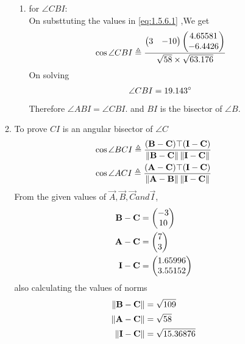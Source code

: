 \documentclass[11pt]{book}
\begin{document}
\begin{enumerate}[label=\thesection.\arabic*.,ref=\thesection.\theenumi]
\begin{enumerate}
\begin{enumerate}
       \item for $\angle CBI$: \\
    On substtuting the values in  \eqref{eq:1.5.6.1} ,We get 
    \begin{align}
        \cos{\angle CBI} \triangleq \frac{\begin{pmatrix} 3 & -10\end{pmatrix}\begin{pmatrix}4.65581 \\ -6.4426\end{pmatrix}}{ \sqrt{58} \times \sqrt{63.176}} \\
    \end{align}
    On solving 
    \begin{align}
        \angle CBI = 19.143\degree
    \end{align}
    Therefore $\angle ABI = \angle CBI.$ and $BI$ is the bisector of $\angle B$. 
\end{enumerate}

    \item To prove $CI$ is an angular bisector of $ \angle C$
\begin{align}
\label{eq:1.5.6.18}
\cos{\angle BCI} \triangleq \frac{(\vec{B}-\vec{C})\top(\vec{I}-\vec{C})}{\norm{\vec{B}-\vec{C}}\norm{\vec{I}-\vec{C}}} \\
\cos{\angle ACI} \triangleq \frac{(\vec{A}-\vec{C})\top(\vec{I}-\vec{C})}{\norm{\vec{A}-\vec{B}}\norm{\vec{I}-\vec{C}}} 
\end{align}
From the given values of $\vec{A},\vec{B},\vec{C} and \vec{I}$,\\
\begin{align}
	\mathbf{B}-\mathbf{C} &=\begin{pmatrix}-3\\10\end{pmatrix} \\
	\mathbf{A}-\mathbf{C}&= \begin{pmatrix}7\\3\end{pmatrix} \\
 \mathbf{I}-\mathbf{C}  &=\begin{pmatrix}1.65996 \\ 3.55152\end{pmatrix}
\end{align}
also calculating the values of norms
\begin{align}
	\left\lVert\mathbf{B}-\mathbf{C}\right\rVert &=\sqrt{109} \\
	\left\lVert\mathbf{A}-\mathbf{C}\right\rVert &= \sqrt{58} \\
 	\left\lVert\mathbf{I}-\mathbf{C}\right\rVert &= \sqrt{15.36876} \\
\end{align}


\end{enumerate}
\end{enumerate}
\end{document}
